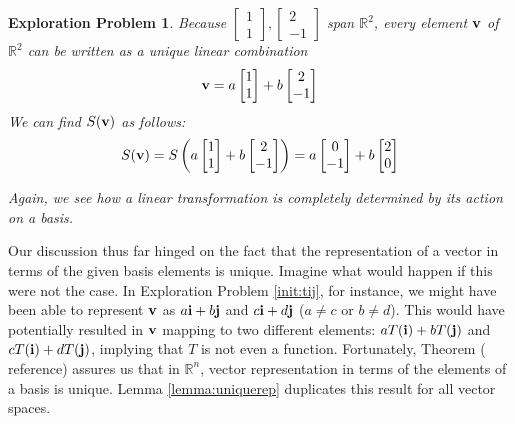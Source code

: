 \documentclass{ximera}
\renewcommand{\vec}[1]{{\bf #1}}
\newcommand{\RR}{\mathbb{R}}
\newtheorem{initprob}{Exploration Problem}
\begin{document}
\begin{initprob}
Because $\begin{bmatrix}1\\1\end{bmatrix},\begin{bmatrix}2\\-1\end{bmatrix}$ span $\RR^2$, every element $\vec{v}$ of $\RR^2$ can be written as a unique linear combination $$\vec{v}=a\begin{bmatrix}1\\1\end{bmatrix}+b\begin{bmatrix}2\\-1\end{bmatrix}$$
We can find $S(\vec{v})$ as follows:
$$S(\vec{v})=S\left(a\begin{bmatrix}1\\1\end{bmatrix}+b\begin{bmatrix}2\\-1\end{bmatrix}\right)=a\begin{bmatrix}0\\-1\end{bmatrix}+b\begin{bmatrix}2\\0\end{bmatrix}$$

Again, we see how a linear transformation is completely determined by its action on a basis.

\end{initprob}



Our discussion thus far hinged on the fact that the representation of a vector in terms of the given basis elements is unique.  Imagine what would happen if this were not the case.  In Exploration Problem \ref{init:tij}, for instance, we might have been able to represent $\vec{v}$ as $a\vec{i}+b\vec{j}$ and $c\vec{i}+d\vec{j}$ ($a\neq c$ or $b\neq d$).  This would have potentially resulted in $\vec{v}$ mapping to two different elements: $aT(\vec{i})+bT(\vec{j})$ and $cT(\vec{i})+dT(\vec{j})$, implying that $T$ is not even a function.  Fortunately, Theorem ({\color{red} reference}) assures us that in $\RR^n$, vector representation in terms of the elements of a basis is unique.  
Lemma \ref{lemma:uniquerep} duplicates this result for all vector spaces.
\end{document}
